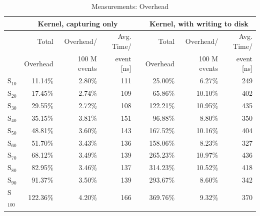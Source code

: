 \begin{table}[h] 
\footnotesize
\addtolength{\tabcolsep}{-2pt}
\label{Overhead}
\caption{Measurements: Overhead}
\centering          

\begin{tabular}{l r r r r r r r}    
\hline\hline 
	&	\multicolumn{3}{c}{Kernel, capturing only} & & \multicolumn{3}{c}{Kernel, with writing to disk} \\
\hline  
	&	Total	&	Overhead/	&	Avg. Time/	&		&	Total	&	Overhead/	&	Avg. Time/	\\
	&	Overhead	&	100 M events	&	event [ns]	&		&	Overhead	&	100 M events	&	event [ns]	\\
\hline
S$_{10}$ &	11.14\%	&	2.80\%	&	111	&		&	25.00\%		&	6.27\%	&	249	\\
S$_{20}$ &	17.45\%	&	2.74\%	&	109	&		&	65.86\%		&	10.10\%	&	402	\\
S$_{30}$ &	29.55\%	&	2.72\%	&	108	&		&	122.21\%	&	10.95\%	&	435	\\
S$_{40}$ &	35.15\%	&	3.81\%	&	151	&		&	96.88\%		&	8.80\%	&	350	\\
S$_{50}$ &	48.81\%	&	3.60\%	&	143	&		&	167.52\%	&	10.16\%	&	404	\\
S$_{60}$ &	51.70\%	&	3.43\%	&	136	&		&	158.06\%	&	8.23\%	&	327	\\
S$_{70}$ &	68.12\%	&	3.49\%	&	139	&		&	265.23\%	&	10.97\%	&	436	\\
S$_{80}$ &	82.95\%	&	3.46\%	&	137	&		&	314.23\%	&	10.52\%	&	418	\\
S$_{90}$ &	91.37\%	&	3.50\%	&	139	&		&	293.67\%	&	8.60\%	&	342	\\
S$_{100}$&	122.36\%&	4.20\%	&	166	&		&	369.76\%	&	9.32\%	&	370	\\\hlinen
\end{tabular}
\end{table}

